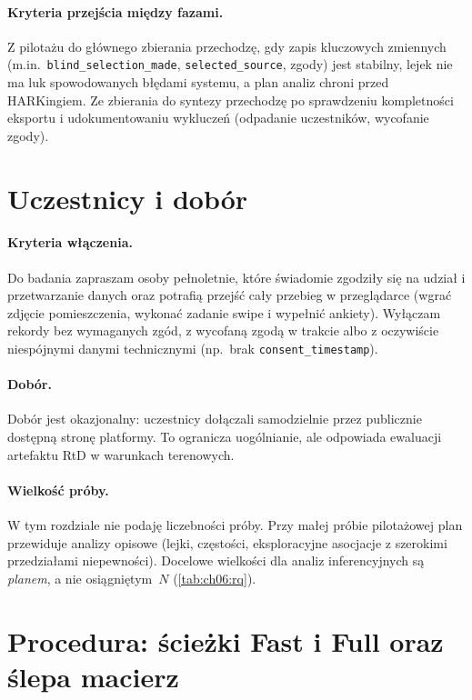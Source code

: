 \paragraph{Kryteria przejścia między fazami.}
Z pilotażu do głównego zbierania przechodzę, gdy zapis kluczowych zmiennych (m.in.\ \texttt{blind\_selection\_made}, \texttt{selected\_source}, zgody) jest stabilny, lejek nie ma luk spowodowanych błędami systemu, a plan analiz chroni przed HARKingiem. Ze zbierania do syntezy przechodzę po sprawdzeniu kompletności eksportu i udokumentowaniu wykluczeń (odpadanie uczestników, wycofanie zgody).

\section{Uczestnicy i dobór}
\label{ch06:sec:uczestnicy}

\paragraph{Kryteria włączenia.}
Do badania zapraszam osoby pełnoletnie, które świadomie zgodziły się na udział i przetwarzanie danych oraz potrafią przejść cały przebieg w przeglądarce (wgrać zdjęcie pomieszczenia, wykonać zadanie swipe i wypełnić ankiety). Wyłączam rekordy bez wymaganych zgód, z wycofaną zgodą w trakcie albo z oczywiście niespójnymi danymi technicznymi (np.\ brak \texttt{consent\_timestamp}).

\paragraph{Dobór.}
Dobór jest okazjonalny: uczestnicy dołączali samodzielnie przez publicznie dostępną stronę platformy. To ogranicza uogólnianie, ale odpowiada ewaluacji artefaktu RtD w warunkach terenowych.

\paragraph{Wielkość próby.}
W tym rozdziale nie podaję liczebności próby. Przy małej próbie pilotażowej plan przewiduje analizy opisowe (lejki, częstości, eksploracyjne asocjacje z szerokimi przedziałami niepewności). Docelowe wielkości dla analiz inferencyjnych są \emph{planem}, a nie osiągniętym~$N$ (\cref{tab:ch06:rq}).

\section{Procedura: ścieżki Fast i Full oraz ślepa macierz}
\label{ch06:sec:procedura}

